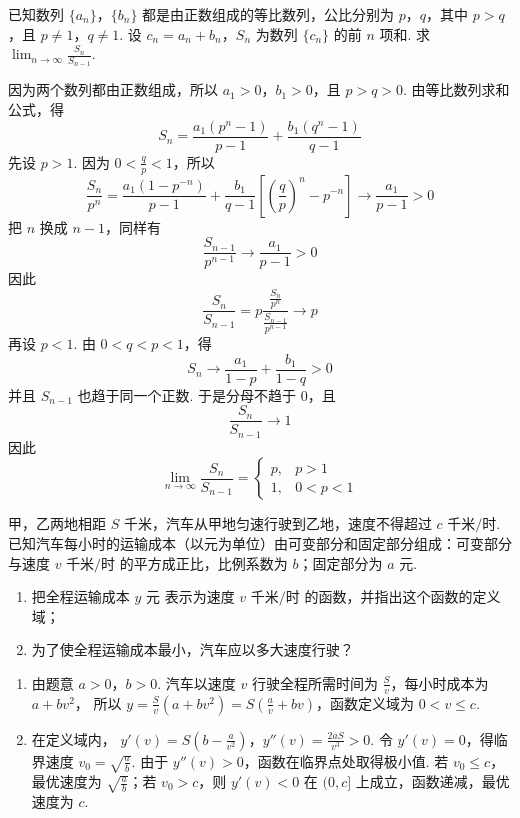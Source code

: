 \begin{problem}
已知数列 \(\{a_{n}\}\)，\(\{b_{n}\}\) 都是由正数组成的等比数列，公比分别为 \(p\)，\(q\)，其中 \(p > q\)，且 \(p \neq 1\)，\(q \neq 1\). 设 \(c_{n} = a_{n} + b_{n}\)，\(S_{n}\) 为数列 \(\{c_{n}\}\) 的前 \(n\) 项和. 求 \(\displaystyle\lim_{n \to \infty} \frac{S_{n}}{S_{n-1}}\).
\end{problem}

\begin{solution}
因为两个数列都由正数组成，所以 \(a_{1}>0\)，\(b_{1}>0\)，且 \(p>q>0\). 由等比数列求和公式，得
\[
S_{n}=\frac{a_{1}(p^{n}-1)}{p-1}+\frac{b_{1}(q^{n}-1)}{q-1}
\]
先设 \(p>1\). 因为 \(0<\frac{q}{p}<1\)，所以
\[
\frac{S_{n}}{p^{n}}=\frac{a_{1}(1-p^{-n})}{p-1}+\frac{b_{1}}{q-1}\left[\left(\frac{q}{p}\right)^{n}-p^{-n}\right]\longrightarrow\frac{a_{1}}{p-1}>0
\]
把 \(n\) 换成 \(n-1\)，同样有
\[
\frac{S_{n-1}}{p^{n-1}}\longrightarrow\frac{a_{1}}{p-1}>0
\]
因此
\[
\frac{S_{n}}{S_{n-1}}=p\frac{\frac{S_{n}}{p^{n}}}{\frac{S_{n-1}}{p^{n-1}}}\longrightarrow p
\]
再设 \(p<1\). 由 \(0<q<p<1\)，得
\[
S_{n}\longrightarrow\frac{a_{1}}{1-p}+\frac{b_{1}}{1-q}>0
\]
并且 \(S_{n-1}\) 也趋于同一个正数. 于是分母不趋于 \(0\)，且
\[
\frac{S_{n}}{S_{n-1}}\longrightarrow1
\]
因此
\[
\lim_{n\to\infty}\frac{S_{n}}{S_{n-1}}=
\begin{cases}
p,&p>1\\
1,&0<p<1
\end{cases}
\]
\end{solution}

\begin{problem}
甲，乙两地相距 \(S\text{ 千米}\)，汽车从甲地匀速行驶到乙地，速度不得超过 \(c\text{ 千米/时}\). 已知汽车每小时的运输成本（以元为单位）由可变部分和固定部分组成：可变部分与速度 \(v\text{ 千米/时}\) 的平方成正比，比例系数为 \(b\)；固定部分为 \(a\text{ 元}\).

\begin{enumerate}
\item 把全程运输成本 \(y\text{ 元}\) 表示为速度 \(v\text{ 千米/时}\) 的函数，并指出这个函数的定义域；

\item 为了使全程运输成本最小，汽车应以多大速度行驶？
\end{enumerate}
\end{problem}

\begin{solution}
\begin{enumerate}
\item 由题意 \(a>0\)，\(b>0\). 汽车以速度 \(v\) 行驶全程所需时间为 \(\frac{S}{v}\)，每小时成本为 \(a+bv^{2}\)，
所以 \(y=\frac{S}{v}(a+bv^{2})=S\left(\frac{a}{v}+bv\right)\)，函数定义域为 \(0<v\leqslant c\).
\item 在定义域内，
\(y'(v)=S\left(b-\frac{a}{v^{2}}\right)\)，\(y''(v)=\frac{2aS}{v^{3}}>0\).
令 \(y'(v)=0\)，得临界速度 \(v_{0}=\sqrt{\frac{a}{b}}\). 由于 \(y''(v)>0\)，函数在临界点处取得极小值. 若 \(v_{0}\leqslant c\)，最优速度为 \(\sqrt{\frac{a}{b}}\)；若 \(v_{0}>c\)，则 \(y'(v)<0\) 在 \((0,c]\) 上成立，函数递减，最优速度为 \(c\).
\end{enumerate}
\end{solution}

